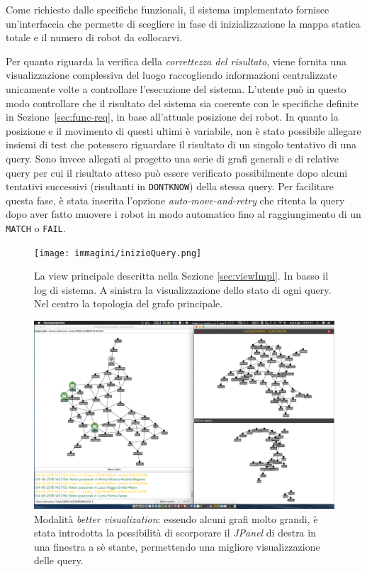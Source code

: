 Come richiesto dalle specifiche funzionali,
il sistema implementato fornisce un'interfaccia che permette di
scegliere in fase di inizializzazione la mappa statica totale
e il numero di robot da collocarvi.

Per quanto riguarda la verifica della
\emph{correttezza del risultato},
viene fornita una visualizzazione complessiva del luogo raccogliendo
informazioni centralizzate unicamente volte a controllare
l'esecuzione del sistema.
L'utente può in questo modo controllare che il risultato del
sistema sia coerente con le specifiche definite in Sezione~\ref{sec:func-req},
in base all'attuale posizione dei robot.
In quanto la posizione e il movimento di questi ultimi è variabile,
non è stato possibile allegare insiemi di test che potessero
riguardare il risultato di un singolo tentativo di una query.
Sono invece allegati al progetto una serie di grafi generali
e di relative query per cui il risultato atteso può essere verificato
possibilmente dopo alcuni tentativi successivi (risultanti
in \texttt{DONTKNOW}) della stessa query.
Per facilitare questa fase, è stata inserita l'opzione \emph{auto-move-and-retry} che ritenta la query dopo aver fatto muovere i robot
in modo automatico fino al raggiungimento di un
\texttt{MATCH} o \texttt{FAIL}.

\begin{figure}
\centering
\texttt{[image: immagini/inizioQuery.png]}
\caption{La view principale descritta nella Sezione \ref{sec:viewImpl}.
In basso il log di sistema. A sinistra la visualizzazione dello stato di ogni query.
Nel centro la topologia del grafo principale.}
\end{figure}
\begin{figure}
\centering
\includegraphics[width=1\textwidth]{immagini/betterVisualization.png}
\caption{Modalità \emph{better visualization}: essendo
alcuni grafi molto grandi, è stata introdotta la possibilità di
scorporare il \emph{JPanel} di destra in una finestra a sè
stante, permettendo una migliore visualizzazione delle query.}
\end{figure}

